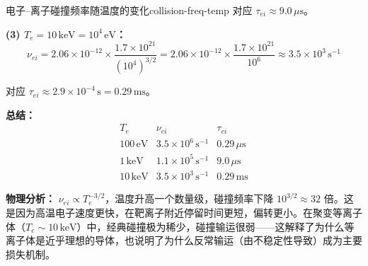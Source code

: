 \begin{example}{电子--离子碰撞频率随温度的变化}{collision-freq-temp}
对应 $\tau_{ei} \approx 9.0\,\mu\mathrm{s}$。

\textbf{(3) $T_e = 10\,\mathrm{keV} = 10^4\,\mathrm{eV}$：}
\[
\nu_{ei} = 2.06\times 10^{-12}\times\frac{1.7\times 10^{21}}{(10^4)^{3/2}}
= 2.06\times 10^{-12}\times\frac{1.7\times 10^{21}}{10^6}
\approx 3.5\times 10^{3}\,\mathrm{s}^{-1}
\]

对应 $\tau_{ei} \approx 2.9\times 10^{-4}\,\mathrm{s} = 0.29\,\mathrm{ms}$。

\textbf{总结：}
\[
\begin{array}{c|c|c}
T_e & \nu_{ei} & \tau_{ei} \\ \hline
100\,\mathrm{eV} & 3.5\times 10^{6}\,\mathrm{s}^{-1} & 0.29\,\mu\mathrm{s} \\
1\,\mathrm{keV} & 1.1\times 10^{5}\,\mathrm{s}^{-1} & 9.0\,\mu\mathrm{s} \\
10\,\mathrm{keV} & 3.5\times 10^{3}\,\mathrm{s}^{-1} & 0.29\,\mathrm{ms}
\end{array}
\]

\textbf{物理分析：} $\nu_{ei} \propto T_e^{-3/2}$，温度升高一个数量级，碰撞频率下降 $10^{3/2}\approx32$ 倍。这是因为高温电子速度更快，在靶离子附近停留时间更短，偏转更小。在聚变等离子体（$T_e\sim 10\,\mathrm{keV}$）中，经典碰撞极为稀少，碰撞输运很弱——这解释了为什么等离子体是近乎理想的导体，也说明了为什么反常输运（由不稳定性导致）成为主要损失机制。
\end{example}

